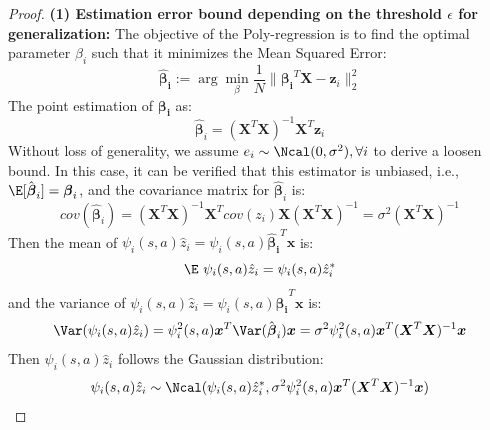 \begin{proof}
\textbf{(1) Estimation error bound depending on the threshold $\epsilon$ for generalization:} The objective of the Poly-regression is to find the optimal parameter $\beta_i$ such that it minimizes the Mean Squared Error:
\begin{equation}
    \boldsymbol{\hat{\beta}_i} := \arg \min_\beta \frac{1}{N} \| \boldsymbol{\beta_i}^T  \boldsymbol{X} -\boldsymbol{z}_i \|^2_2
\end{equation}
The point estimation of $\boldsymbol{\beta_i}$ as:
\begin{equation}
    \hat{\boldsymbol{\beta}}_i = \left(\boldsymbol{X}^T \boldsymbol{X}\right)^{-1} \boldsymbol{X}^T \boldsymbol{z}_i
\end{equation}
Without loss of generality, we assume $e_i \sim \Ncal(0, \sigma^2), \forall i$ to derive a loosen bound. In this case, it can be verified that this estimator is unbiased, i.e., 
$\E [ \hat{\boldsymbol{\beta}}_i ] = \boldsymbol{\beta}_i$, and the covariance matrix for $\hat{\boldsymbol{\beta}}_i$ is:
\begin{equation}
    cov(\hat{\boldsymbol{\beta}}_i) = (\boldsymbol{X}^T \boldsymbol{X})^{-1} \boldsymbol{X}^T cov(z_i) \boldsymbol{X} (\boldsymbol{X}^T \boldsymbol{X})^{-1} = \sigma^2 (\boldsymbol{X}^T \boldsymbol{X})^{-1}
\end{equation}
Then the mean of $\psi_{i}(s, a) \hat{z}_i = \psi_{i}(s, a)\boldsymbol{\hat{\beta}_i}^T \boldsymbol{x}$ is:
\begin{equation}
    \E \ \psi_{i}(s, a) \hat{z}_i = \psi_{i}(s, a) \hat{z}^*_i
\end{equation}
and the variance of $\psi_{i}(s, a) \hat{z}_i = \psi_{i}(s, a)\boldsymbol{\hat{\beta}_i}^T \boldsymbol{x}$ is:
\begin{equation}
\begin{aligned}
    \Var(\psi_{i}(s, a)\hat{z}_i)  = \psi_{i}^2(s, a)\boldsymbol{x}^T \Var(\hat{\boldsymbol{\beta}}_i) \boldsymbol{x} = \sigma^2\psi_{i}^2(s, a) \boldsymbol{x}^T (\boldsymbol{X}^T \boldsymbol{X})^{-1} \boldsymbol{x}
\end{aligned}
\end{equation}
Then $\psi_{i}(s, a)\hat{z}_i$ follows the Gaussian distribution:
\begin{equation}
    \psi_{i}(s, a)\hat{z}_i \sim \Ncal(\psi_{i}(s, a) \hat{z}^*_i, \sigma^2\psi_{i}^2(s, a) \boldsymbol{x}^T (\boldsymbol{X}^T \boldsymbol{X})^{-1} \boldsymbol{x})

\end{equation}
\end{proof}
